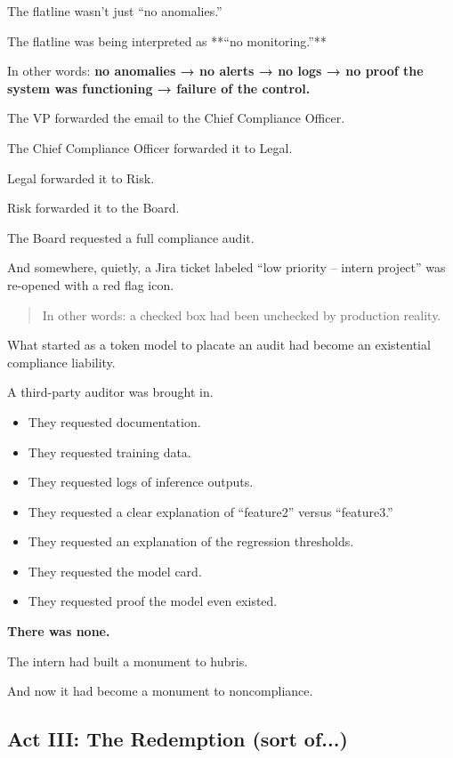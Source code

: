 The flatline wasn’t just “no anomalies.”

The flatline was being interpreted as **“no monitoring.”**

In other words:  \textbf{no anomalies → no alerts → no logs → no proof the system was functioning → failure of the control.}

The VP forwarded the email to the Chief Compliance Officer.

The Chief Compliance Officer forwarded it to Legal.

Legal forwarded it to Risk.

Risk forwarded it to the Board.

The Board requested a full compliance audit.

And somewhere, quietly, a Jira ticket labeled “low priority – intern project” was re-opened with a red flag icon.


\begin{quote}
In other words: a checked box had been unchecked by production reality.
\end{quote}

What started as a token model to placate an audit had become an existential compliance liability.

A third-party auditor was brought in.

\begin{itemize}

    \item They requested documentation.
    \item They requested training data.
    \item They requested logs of inference outputs.
    \item They requested a clear explanation of “feature2” versus “feature3.”
    \item They requested an explanation of the regression thresholds.
    \item They requested the model card.
    \item They requested proof the model even existed.

\end{itemize}

\textbf{There was none.}

The intern had built a monument to hubris.

And now it had become a monument to noncompliance.
    



\subsection{Act III: The Redemption (sort of...)}

